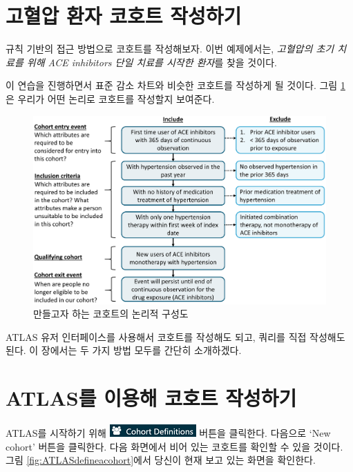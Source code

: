 \documentclass[10.5pt]{book}
\theoremstyle{definition}
\theoremstyle{definition}
\theoremstyle{definition}
\theoremstyle{remark}
\begin{document}
\section{고혈압 환자 코호트 작성하기}\label{---}

규칙 기반의 접근 방법으로 코호트를 작성해보자. 이번 예제에서는,
\emph{고혈압의 초기 치료를 위해 ACE inhibitors 단일 치료를 시작한
환자}를 찾을 것이다.

이 연습을 진행하면서 표준 감소 차트와 비슷한 코호트를 작성하게 될
것이다. 그림 \ref{fig:CohortPractice}은 우리가 어떤 논리로 코호트를
작성할지 보여준다.

\begin{figure}

{\centering \includegraphics[width=1\linewidth]{images/Cohorts/CohortPractice} 

}

\caption{만들고자 하는 코호트의 논리적 구성도}\label{fig:CohortPractice}
\end{figure}

ATLAS 유저 인터페이스를 사용해서 코호트를 작성해도 되고, 쿼리를 직접
작성해도 된다. 이 장에서는 두 가지 방법 모두를 간단히 소개하겠다.

\section{ATLAS를 이용해 코호트 작성하기}\label{atlas---}

ATLAS를 시작하기 위해
\includegraphics{images/Cohorts/cohortdefinition.png} 버튼을 클릭한다.
다음으로 `New cohort' 버튼을 클릭한다. 다음 화면에서 비어 있는 코호트를
확인할 수 있을 것이다. 그림 \ref{fig:ATLASdefineacohort}에서 당신이 현재
보고 있는 화면을 확인한다.
\end{document}
